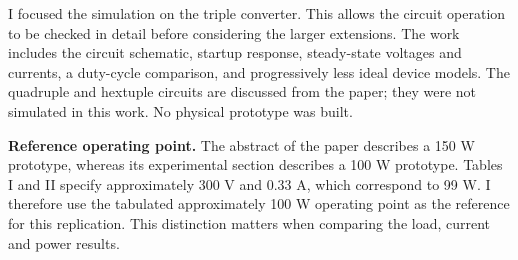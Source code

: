 \documentclass[11pt,a4paper]{article}
\begin{document}
I focused the simulation on the triple converter. This allows the circuit operation to be checked in detail before considering the larger extensions. The work includes the circuit schematic, startup response, steady-state voltages and currents, a duty-cycle comparison, and progressively less ideal device models. The quadruple and hextuple circuits are discussed from the paper; they were not simulated in this work. No physical prototype was built.

\textbf{Reference operating point.} The abstract of the paper describes a 150 W prototype, whereas its experimental section describes a 100 W prototype. Tables I and II specify approximately 300 V and 0.33 A, which correspond to 99 W. I therefore use the tabulated approximately 100 W operating point as the reference for this replication. This distinction matters when comparing the load, current and power results.
\clearpage
\end{document}
